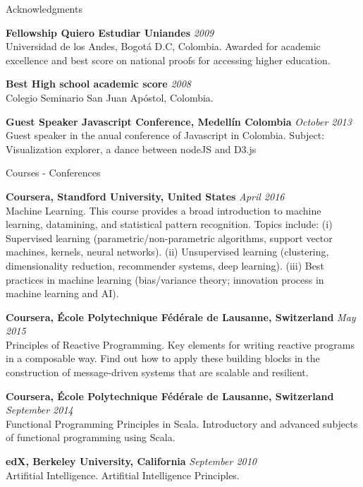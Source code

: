 \documentclass[spanish]{resume}
\begin{document}
\begin{rSection}{Acknowledgments}

{\bf Fellowship Quiero Estudiar Uniandes} \hfill {\em 2009} \\
Universidad de los Andes, Bogot\'a D.C, Colombia.
Awarded for academic excellence and best score on national proofs for accessing higher education.

{\bf Best High school academic score} \hfill {\em 2008} \\
Colegio Seminario San Juan Ap\'ostol, Colombia.

{\bf Guest Speaker Javascript Conference, Medell\'in Colombia} \hfill {\em October 2013} \\
Guest speaker in the anual conference of Javascript in Colombia.
Subject: Visualization explorer, a dance between nodeJS and D3.js


\end{rSection}


\begin{rSection}{Courses - Conferences}

{\bf Coursera, Standford University, United States} \hfill {\em April 2016} \\
Machine Learning.
This course provides a broad introduction to machine learning, datamining, and statistical pattern recognition. Topics include: (i) Supervised learning (parametric/non-parametric algorithms, support vector machines, kernels, neural networks). (ii) Unsupervised learning (clustering, dimensionality reduction, recommender systems, deep learning). (iii) Best practices in machine learning (bias/variance theory; innovation process in machine learning and AI).

{\bf Coursera, \'Ecole Polytechnique F\'ed\'erale de Lausanne, Switzerland} \hfill {\em May 2015} \\
Principles of Reactive Programming.
Key elements for writing reactive programs in a composable way. Find out how to apply these building blocks in the construction of message-driven systems that are scalable and resilient.

{\bf Coursera, \'Ecole Polytechnique F\'ed\'erale de Lausanne, Switzerland} \hfill {\em September 2014} \\
Functional Programming Principles in Scala.
Introductory and advanced subjects of functional programming using Scala.

{\bf edX, Berkeley University, California} \hfill {\em September 2010} \\
Artifitial Intelligence.
Artifitial Intelligence Principles.

\end{rSection}
\end{document}

